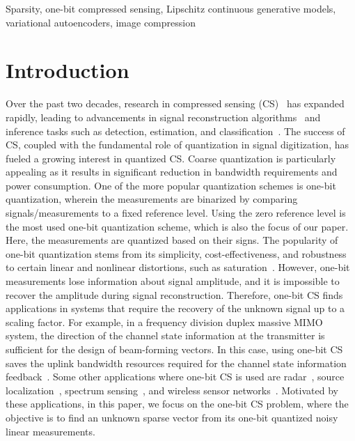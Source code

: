 \documentclass[journal]{IEEEtran}
\begin{document}
\begin{keywords}
Sparsity, one-bit compressed sensing, Lipschitz continuous generative models, variational autoencoders, image compression
\end{keywords}
\section{Introduction}
Over the past two decades, research in compressed sensing (CS)~\cite{rani2018systematic,qaisar2013compressive} has expanded rapidly, leading to advancements in signal reconstruction algorithms~\cite{OMP, BCS, CSBP, Cevher1, IHT} and inference tasks such as detection, estimation, and classification~\cite{Nowak, kafleDet, wimalajeewapartial, app}. The success of CS, coupled with the fundamental role of quantization in signal digitization, has fueled a growing interest in quantized CS\cite{li2018survey, quantized_dai, quantized_jacques}. Coarse quantization is particularly appealing as it results in significant reduction in bandwidth requirements and power consumption. One of the more popular quantization schemes is one-bit quantization, wherein the measurements are binarized by comparing signals/measurements to a fixed reference level. Using the zero reference level is the most used one-bit quantization scheme, which is also the focus of our paper. Here, the measurements are quantized based on their signs. The popularity of one-bit quantization stems from its simplicity, cost-effectiveness, and robustness to certain linear and nonlinear distortions, such as saturation~\cite{boufounos20081, laska2011trust}. However, one-bit measurements lose information about signal amplitude, and it is impossible to recover the amplitude during signal reconstruction. Therefore, one-bit CS finds applications in systems that require the recovery of the unknown signal up to a scaling factor. For example, in a frequency division duplex massive MIMO system, the direction of the channel state information at the transmitter is sufficient for the design of beam-forming vectors. In this case, using one-bit CS saves the uplink bandwidth resources required for the channel state information feedback~\cite{tang2017low}. Some other applications where one-bit CS is used are radar~\cite{ameri2019one}, source localization~\cite{shen2013one}, spectrum sensing~\cite{jian2011investigation}, and wireless sensor networks~\cite{cao2016implementation}. Motivated by these applications, in this paper, we focus on the one-bit CS problem, where the objective is to find an unknown sparse vector from its one-bit quantized noisy linear measurements.
\end{document}
